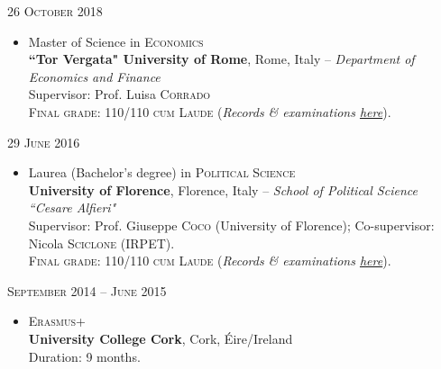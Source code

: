 \documentclass{article}
\begin{document}
26 \textsc{October} 2018

\begin{itemize}
	\item Master of Science in \textsc{Economics}\\
	\textbf{``Tor Vergata" University of Rome}, Rome, Italy --  \textit{Department of Economics and Finance}\\
	Supervisor: Prof. Luisa \textsc{Corrado}\\
	\textsc{Final grade}: 110/110 \small{\textsc{cum Laude}} (\emph{Records \& examinations \href{https://drive.google.com/open?id=1kvlLCSVwPrPx174BgFq5_sFjNEL1D4ax}{here}}).
\end{itemize}

29 \textsc{June} 2016

\begin{itemize}
	\item Laurea (Bachelor's degree) in \textsc{Political Science}\\
	\textbf{University of Florence}, Florence, Italy -- \emph{School of Political Science ``Cesare Alfieri"}\\
	Supervisor: Prof. Giuseppe \textsc{Coco} (University of Florence); Co-supervisor: Nicola \textsc{Sciclone} (IRPET).\\
	\textsc{Final grade}: 110/110 \small{\textsc{cum Laude}} (\emph{Records \& examinations \href{https://drive.google.com/file/d/1refufmt512-mjP1kc0cmbN793zsFp7e8/view?usp=sharing}{here}}).
\end{itemize}

\textsc{September} 2014 -- \textsc{June} 2015

\begin{itemize}
	\item \textsc{Erasmus+}\\
	\textbf{University College Cork}, Cork, \'{E}ire/Ireland\\
	Duration: 9 months.
\end{itemize}
\end{document}

